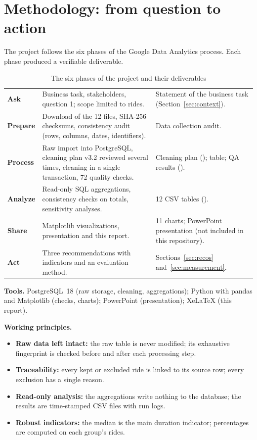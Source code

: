 \section{Methodology: from question to action}
\label{sec:method}

The project follows the six phases of the Google Data Analytics process. Each phase produced a verifiable deliverable.

\begin{table}[H]
\caption{The six phases of the project and their deliverables}
\label{tab:phases}
\small
\begin{tabularx}{\linewidth}{L{2.1cm} Y L{4.6cm}}
\toprule
{} &  &  \\
\midrule
\textbf{Ask} & Business task, stakeholders, question 1; scope limited to rides. & Statement of the business task (Section~\ref{sec:context}). \\
\textbf{Prepare} & Download of the 12 files, SHA-256 checksums, consistency audit (rows, columns, dates, identifiers). & Data collection audit. \\
\textbf{Process} & Raw import into PostgreSQL, cleaning plan v3.2 reviewed several times, cleaning in a single transaction, 72 quality checks. & Cleaning plan ();  table; QA results (). \\
\textbf{Analyze} & Read-only SQL aggregations, consistency checks on totals, sensitivity analyses. & 12 CSV tables (). \\
\textbf{Share} & Matplotlib visualizations, presentation and this report. & 11 charts; PowerPoint presentation (not included in this repository). \\
\textbf{Act} & Three recommendations with indicators and an evaluation method. & Sections~\ref{sec:recos} and~\ref{sec:measurement}. \\
\bottomrule
\end{tabularx}
\end{table}

\textbf{Tools.} PostgreSQL~18 (raw storage, cleaning, aggregations); Python with pandas and Matplotlib (checks, charts); PowerPoint (presentation); XeLaTeX (this report).

\textbf{Working principles.}
\begin{itemize}
  \item \textbf{Raw data left intact:} the raw table is never modified; its exhaustive fingerprint is checked before and after each processing step.
  \item \textbf{Traceability:} every kept or excluded ride is linked to its source row; every exclusion has a single reason.
  \item \textbf{Read-only analysis:} the aggregations write nothing to the database; the results are time-stamped CSV files with run logs.
  \item \textbf{Robust indicators:} the median is the main duration indicator; percentages are computed on each group's rides.
\end{itemize}
